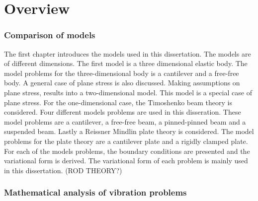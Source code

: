 \documentclass[../main.tex]{subfiles}
\begin{document}
\section{Overview}

\subsubsection{Comparison of models}
The first chapter introduces the models used in this dissertation. The models are of different dimensions. The first model is a three dimensional elastic body. The model problems for the three-dimensional body is a cantilever and a free-free body. A general case of plane stress is also discussed. Making assumptions on plane stress, results into a two-dimensional model. This model is a special case of plane stress. For the one-dimensional case, the Timoshenko beam theory is considered. Four different models problems are used in this disseration. These model problems are a cantilever, a free-free beam, a pinned-pinned beam and a suspended beam. Lastly a Reissner Mindlin plate theory is considered. The model problems for the plate theory are a cantilever plate and a rigidly clamped plate. For each of the models problems, the boundary conditions are presented and the variational form is derived. The variational form of each problem is mainly used in this dissertation. (ROD THEORY?)

\subsubsection{Mathematical analysis of vibration problems}
\end{document}
